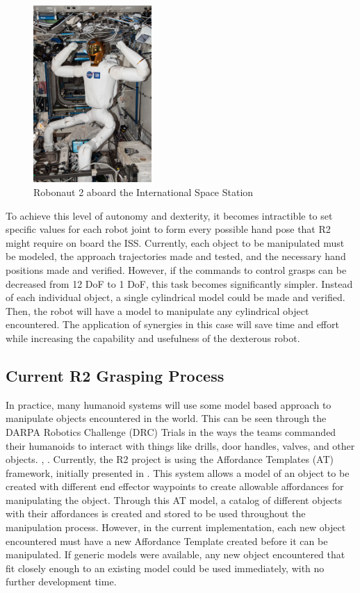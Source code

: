 \documentclass[runningheads,a4paper]{llncs}
\begin{document}
   \begin{figure}[t]
      \centering
      \includegraphics[width=0.4\textwidth]{r2_iss}
      \caption{Robonaut 2 aboard the International Space Station}
      \label{at_r2_iss}
   \end{figure}

To achieve this level of autonomy and dexterity, it becomes intractible to set specific values for each robot joint to form every possible hand pose that R2 might require on board the ISS. Currently, each object to be manipulated must be modeled, the approach trajectories made and tested, and the necessary hand positions made and verified. However, if the commands to control grasps can be decreased from 12 DoF to 1 DoF, this task becomes significantly simpler. Instead of each individual object, a single cylindrical model could be made and verified. Then, the robot will have a model to manipulate any cylindrical object encountered. The application of synergies in this case will save time and effort while increasing the capability and usefulness of the dexterous robot.   


\subsection{Current R2 Grasping Process}

In practice, many humanoid systems will use some model based approach to manipulate objects encountered in the world. This can be seen through the DARPA Robotics Challenge (DRC) Trials in the ways the teams commanded their humanoids to interact with things like drills, door handles, valves, and other objects. \cite{DRC_Yanco}, \cite{IHMC}. Currently, the R2 project is using the Affordance Templates (AT) framework, initially presented in \cite{affordance_templates}. This system allows a model of an object to be created with different end effector waypoints to create allowable affordances for manipulating the object. Through this AT model, a catalog of different objects with their affordances is created and stored to be used throughout the manipulation process. However, in the current implementation, each new object encountered must have a new Affordance Template created before it can be manipulated. If generic models were available, any new object encountered that fit closely enough to an existing model could be used immediately, with no further development time. 
\end{document}
